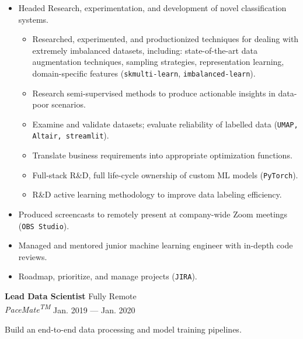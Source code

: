 \documentclass[a4paper,12pt]{article}
\newcommand{\ressubheading}[4]{{\begin{minipage}{\textwidth}
                                    \textbf{#1} \hfill #2 \\
                                    \textit{#3} \hfill #4 \\
\end{minipage}}}
\begin{document}
\begin{itemize}
        \item Headed Research, experimentation, and development of novel classification systems.
        \begin{itemize}
            \item Researched, experimented, and productionized techniques for dealing with extremely imbalanced datasets, including: state-of-the-art data augmentation techniques, sampling strategies,  representation learning, domain-specific features (\texttt{skmulti-learn}, \texttt{imbalanced-learn}).
            \item Research semi-supervised methods to produce actionable insights in data-poor scenarios.
            \item Examine and validate datasets;
            evaluate reliability of labelled data (\texttt{UMAP, Altair, streamlit}).
            \item Translate business requirements into appropriate optimization functions.
            \item Full-stack R\&D, full life-cycle ownership of custom ML models (\texttt{PyTorch}).
            \item R\&D active learning methodology to improve data labeling efficiency.
        \end{itemize}
        \item Produced screencasts to remotely present at company-wide Zoom meetings (\texttt{OBS Studio}).
        \item Managed and mentored junior machine learning engineer with in-depth code reviews.
        \item Roadmap, prioritize, and manage projects (\texttt{JIRA}).

    \end{itemize}


    \ressubheading{Lead Data Scientist}{Fully Remote}{PaceMate\textsuperscript{TM}}{Jan. 2019 --- Jan. 2020}

    \vspace{-6pt} Build an end-to-end data processing and model training pipelines.
\end{document}
